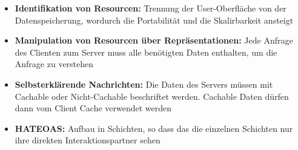 \begin{itemize}
\item \textbf{Identifikation von Resourcen:} Trennung der User-Oberfläche von der Datenspeicherung, wordurch die Portabilität und die Skalirbarkeit ansteigt
\item \textbf{Manipulation von Resourcen über Repräsentationen:} Jede Anfrage des Clienten zum Server muss alle benötigten Daten enthalten, um die Anfrage zu verstehen
\item \textbf{Selbsterklärende Nachrichten:} Die Daten des Servers müssen mit Cachable oder Nicht-Cachable beschriftet werden. Cachable Daten dürfen dann vom Client Cache verwendet werden
\item \textbf{HATEOAS:} Aufbau in Schichten, so dass das die einzelnen Schichten nur ihre direkten Interaktionspartner sehen
\end{itemize}
